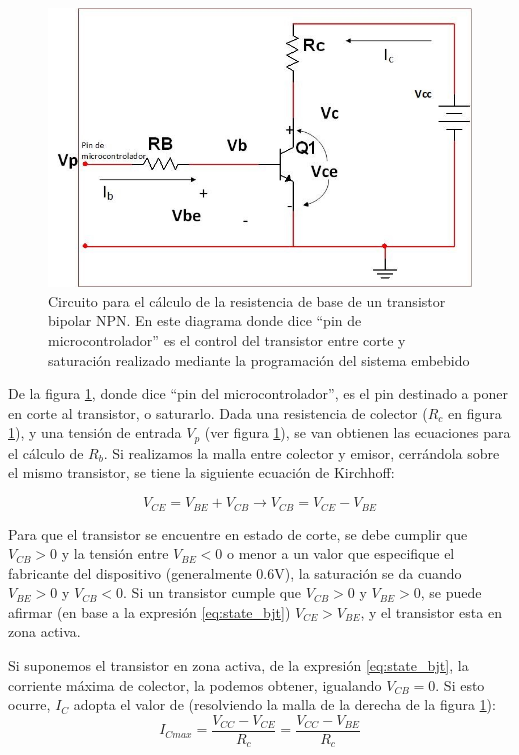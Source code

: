 \begin{figure}[ht!]
	\includegraphics[scale=0.8]{circuito_analisisBJT} 
	\caption{Circuito para el cálculo de la resistencia de base de un transistor bipolar NPN. En este diagrama donde dice ``pin de microcontrolador'' es el control del transistor entre corte y saturación realizado mediante la programación del sistema embebido}
	\label{fig:calc_RB}
\end{figure}


De la figura \ref{fig:calc_RB}, donde dice ``pin del microcontrolador'', es el pin destinado a poner en corte al transistor, o saturarlo. Dada una resistencia de colector ($R_c$ en figura \ref{fig:calc_RB}), y una tensión de entrada $V_p$ (ver figura \ref{fig:calc_RB}), se van obtienen las ecuaciones para el cálculo de $R_b$. 
Si realizamos la malla entre colector y emisor, cerrándola sobre el mismo transistor, se tiene la siguiente ecuación de Kirchhoff: 

\begin{equation} \label{eq:state_bjt}
	V_{CE} = V_{BE} + V_{CB} \rightarrow V_{CB}= V_{CE} - V_{BE}
\end{equation}

Para que el transistor se encuentre en estado de corte, se debe cumplir que $V_{CB}>0$  y la tensión entre $V_{BE}<0$ o menor a un valor que especifique el fabricante del dispositivo (generalmente 0.6V), la saturación se da cuando $V_{BE}>0$ y $V_{CB}<0$. Si un transistor cumple que $V_{CB}>0$ y $V_{BE}>0$, se puede afirmar (en base a la expresión \ref{eq:state_bjt}) $V_{CE}>V_{BE}$, y el transistor esta en zona activa.

Si suponemos el transistor en zona activa, de la expresión \ref{eq:state_bjt}, la corriente máxima de colector, la podemos obtener, igualando $V_{CB}=0$. Si esto ocurre, $I_C$  adopta el valor de (resolviendo la malla de la derecha de la figura \ref{fig:calc_RB}):
\begin{equation} \label{eq:ICmaxSat}
	I_{Cmax} = \frac{V_{CC} - V_{CE}}{R_c} = \frac{V_{CC} - V_{BE}}{R_c}
\end{equation} 

